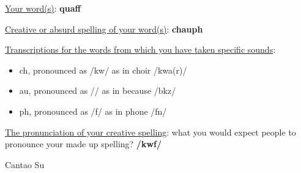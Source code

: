 \documentclass{../labbook}
\begin{document}
\begin{solution}

\underline{Your word(s)}: \textbf{quaff}
\bigskip

\underline{Creative or absurd spelling of your word(s)}: \textbf{chauph}
\bigskip

\underline{Transcriptions for the words from which you have taken specific sounds}:
\begin{itemize}
    \item ch, pronounced as /kw/ as in choir /\textprimstress kwa\textsci \textschwa (r)/
    \item au, pronounced as /\textturnscripta/ as in because /b\textsci \textprimstress k\textturnscripta z/
    \item ph, pronounced as /f/ as in phone /f\textschwa \textupsilon n/
\end{itemize}

\underline{The pronunciation of your creative spelling}: what you would expect people to pronounce your made up spelling? \textbf{/kw\textturnscripta f/} 
\bigskip

Cantao Su


\end{solution}
\end{document}
